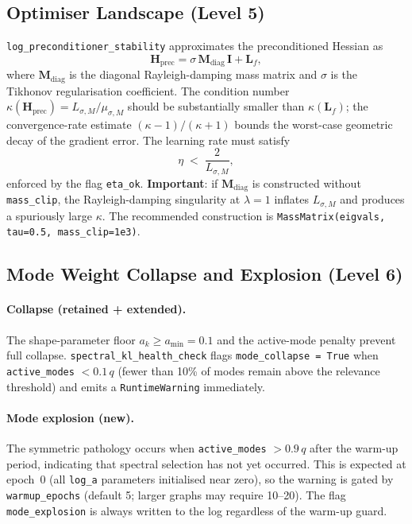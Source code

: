 \documentclass[11pt,a4paper]{article}
\newcommand{\Lmat}{\mathbf{L}}
\begin{document}

\subsection{Optimiser Landscape (Level 5)}
\label{sec:stability:optimiser}

\texttt{log\_preconditioner\_stability} approximates the preconditioned Hessian as
\begin{equation}
  \mathbf{H}_{\mathrm{prec}} = \sigma\,\mathbf{M}_{\mathrm{diag}}\,\mathbf{I} + \Lmat_f,
  \label{eq:hprec}
\end{equation}
where $\mathbf{M}_{\mathrm{diag}}$ is the diagonal Rayleigh-damping mass matrix
and $\sigma$ is the Tikhonov regularisation coefficient.
The condition number $\kappa(\mathbf{H}_{\mathrm{prec}}) = L_{\sigma,M}/\mu_{\sigma,M}$
should be substantially smaller than $\kappa(\Lmat_f)$; the convergence-rate
estimate $({\kappa-1})/({\kappa+1})$ bounds the worst-case geometric decay of
the gradient error.
The learning rate must satisfy
\begin{equation}
  \eta \;<\; \frac{2}{L_{\sigma,M}},
  \label{eq:eta}
\end{equation}
enforced by the flag \texttt{eta\_ok}.
\textbf{Important}: if $\mathbf{M}_{\mathrm{diag}}$ is constructed without
\texttt{mass\_clip}, the Rayleigh-damping singularity at $\lambda = 1$ inflates
$L_{\sigma,M}$ and produces a spuriously large $\kappa$.
The recommended construction is
\texttt{MassMatrix(eigvals, tau=0.5, mass\_clip=1e3)}.


\subsection{Mode Weight Collapse and Explosion (Level 6)}
\label{sec:stability:modeweights}

\paragraph{Collapse (retained + extended).}
The shape-parameter floor $a_k \geq a_{\min} = 0.1$ and the active-mode penalty
prevent full collapse.
\texttt{spectral\_kl\_health\_check} flags \texttt{mode\_collapse = True} when
\texttt{active\_modes} $< 0.1\,q$ (fewer than 10\% of modes remain above the
relevance threshold) and emits a \texttt{RuntimeWarning} immediately.

\paragraph{Mode explosion (new).}
The symmetric pathology occurs when \texttt{active\_modes} $> 0.9\,q$ after the
warm-up period, indicating that spectral selection has not yet occurred.
This is expected at epoch~0 (all \texttt{log\_a} parameters initialised near
zero), so the warning is gated by \texttt{warmup\_epochs} (default 5; larger
graphs may require 10--20).
The flag \texttt{mode\_explosion} is always written to the log regardless of
the warm-up guard.
\end{document}

